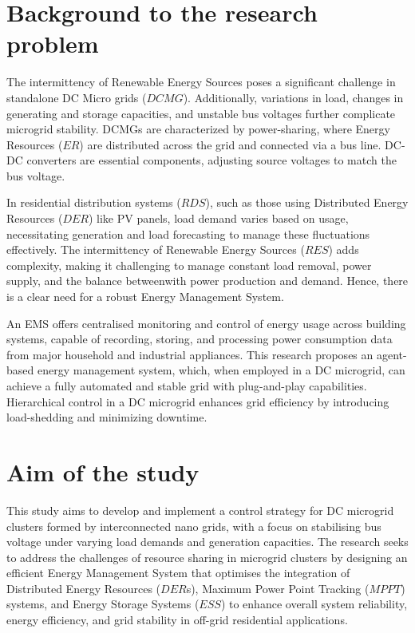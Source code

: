 \section{Background to the research problem}
The intermittency of Renewable Energy Sources poses a significant challenge in standalone DC Micro grids ($DCMG$). Additionally, variations in load, changes in generating and storage capacities, and unstable bus voltages further complicate microgrid stability. DCMGs are characterized by power-sharing, where Energy Resources ($ER$) are distributed across the grid and connected via a bus line. DC-DC converters are essential components, adjusting source voltages to match the bus voltage.\par
In residential distribution systems ($RDS$), such as those using Distributed Energy Resources ($DER$) like PV panels, load demand varies based on usage, necessitating generation and load forecasting to manage these fluctuations effectively. The intermittency of Renewable Energy Sources ($RES$) adds complexity, making it challenging to manage constant load removal, power supply, and the balance betweenwith power production and demand. Hence, there is a clear need for a robust Energy Management System.\par
An EMS offers centralised monitoring and control of energy usage across building systems, capable of recording, storing, and processing power consumption data from major household and industrial appliances. This research proposes an agent-based energy management system, which, when employed in a DC microgrid, can achieve a fully automated and stable grid with plug-and-play capabilities. Hierarchical control in a DC microgrid enhances grid efficiency by introducing load-shedding and minimizing downtime.

\section{Aim of the study}
This study aims to develop and implement a control strategy for DC microgrid clusters formed by interconnected nano grids, with a focus on stabilising bus voltage under varying load demands and generation capacities. The research seeks to address the challenges of resource sharing in microgrid clusters by designing an efficient Energy Management System that optimises the integration of Distributed Energy Resources ($DER$s), Maximum Power Point Tracking ($MPPT$) systems, and Energy Storage Systems ($ESS$) to enhance overall system reliability, energy
efficiency, and grid stability in off-grid residential applications.

